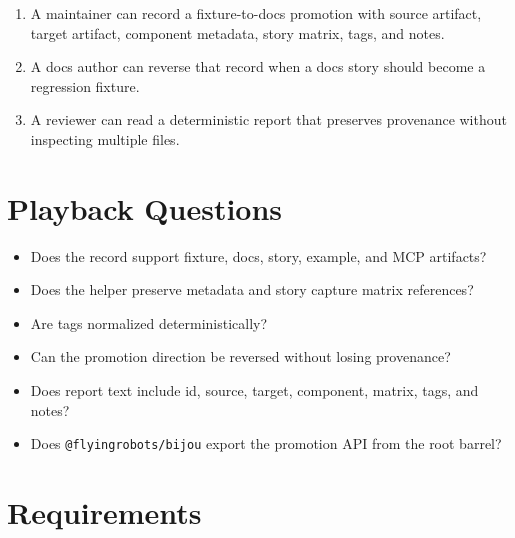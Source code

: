 \begin{enumerate}
\def\labelenumi{\arabic{enumi}.}
\tightlist
\item
  A maintainer can record a fixture-to-docs promotion with source artifact, target artifact, component metadata, story matrix, tags, and notes.
\item
  A docs author can reverse that record when a docs story should become a regression fixture.
\item
  A reviewer can read a deterministic report that preserves provenance without inspecting multiple files.
\end{enumerate}

\section{Playback Questions}\label{record-090-playback-questions}

\begin{itemize}
\tightlist
\item
  Does the record support fixture, docs, story, example, and MCP artifacts?
\item
  Does the helper preserve metadata and story capture matrix references?
\item
  Are tags normalized deterministically?
\item
  Can the promotion direction be reversed without losing provenance?
\item
  Does report text include id, source, target, component, matrix, tags, and notes?
\item
  Does \texttt{@\allowbreak{}f\allowbreak{}l\allowbreak{}y\allowbreak{}i\allowbreak{}n\allowbreak{}g\allowbreak{}r\allowbreak{}o\allowbreak{}b\allowbreak{}o\allowbreak{}t\allowbreak{}s\allowbreak{}/\allowbreak{}b\allowbreak{}i\allowbreak{}j\allowbreak{}o\allowbreak{}u} export the promotion API from the root barrel?
\end{itemize}

\section{Requirements}\label{record-090-requirements}

